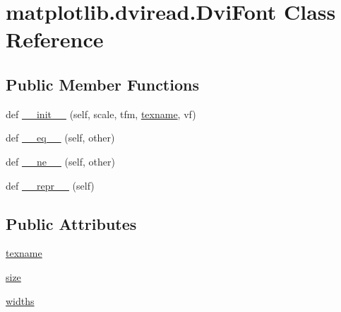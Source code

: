 \hypertarget{classmatplotlib_1_1dviread_1_1DviFont}{}\section{matplotlib.\+dviread.\+Dvi\+Font Class Reference}
\label{classmatplotlib_1_1dviread_1_1DviFont}
\subsection*{Public Member Functions}
\begin{DoxyCompactItemize}
\item 
def \hyperlink{classmatplotlib_1_1dviread_1_1DviFont_a37c86c55aae04802fc5467b7e49d14a7}{\+\_\+\+\_\+init\+\_\+\+\_\+} (self, scale, tfm, \hyperlink{classmatplotlib_1_1dviread_1_1DviFont_afbc7a99318167fe9ae5782a0f2015625}{texname}, vf)
\item 
def \hyperlink{classmatplotlib_1_1dviread_1_1DviFont_a9270ea98c0cc31230de3000ad9325923}{\+\_\+\+\_\+eq\+\_\+\+\_\+} (self, other)
\item 
def \hyperlink{classmatplotlib_1_1dviread_1_1DviFont_a68fc6afb03d3235437d29e64257e281a}{\+\_\+\+\_\+ne\+\_\+\+\_\+} (self, other)
\item 
def \hyperlink{classmatplotlib_1_1dviread_1_1DviFont_ab069f905e5d40ad30c974ede263b48b9}{\+\_\+\+\_\+repr\+\_\+\+\_\+} (self)
\end{DoxyCompactItemize}
\subsection*{Public Attributes}
\begin{DoxyCompactItemize}
\item 
\hyperlink{classmatplotlib_1_1dviread_1_1DviFont_afbc7a99318167fe9ae5782a0f2015625}{texname}
\item 
\hyperlink{classmatplotlib_1_1dviread_1_1DviFont_a35c7010921a38812047da7c1c77c90e6}{size}
\item 
\hyperlink{classmatplotlib_1_1dviread_1_1DviFont_ac039290e1d452c5b257ffaec1108ef39}{widths}
\end{DoxyCompactItemize}


